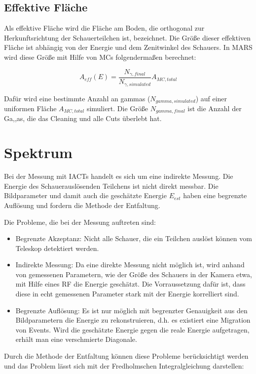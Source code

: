\subsection{Effektive Fläche}
Als effektive Fläche wird die Fläche am Boden, die orthogonal zur Herkunftsrichtung der Schauerteilchen ist, bezeichnet.
Die Größe dieser effektiven Fläche ist abhängig von der Energie und dem Zenitwinkel des Schauers.
In MARS wird diese Größe mit Hilfe von MCs folgendermaßen berechnet:

\begin{equation}
 A_{eff}(E)=\frac{N_{\gamma, final}}{N_{\gamma, simulated}}A_{MC, total}
\end{equation}

Dafür wird eine bestimmte Anzahl an gammas ($N_{gamma, simulated}$) auf einer uniformen Fläche $A_{MC,total}$ simuliert. 
Die Größe $N_{gamma, final}$ ist die Anzahl der Ga,,as, die das Cleaning und alle Cuts überlebt hat.


\section{Spektrum}
Bei der Messung mit IACTs handelt es sich um eine indirekte Messung.
Die Energie des Schauerauslösenden Teilchens ist nicht direkt messbar.
Die Bildparameter und damit auch die geschätzte Energie $E_{est}$ haben eine begrenzte Auflösung und fordern die Methode der Entfaltung.

Die Probleme, die bei der Messung auftreten sind:

\begin{itemize}
 \item Begrenzte Akzeptanz: Nicht alle Schauer, die ein Teilchen auslöst können vom Teleskop detektiert werden.
 \item Indirekte Messung: Da eine direkte Messung nicht möglich ist, wird anhand von gemessenen Parametern, wie der Größe des Schauers in der Kamera etwa, mit Hilfe eines RF die Energie geschätzt.
       Die Vorraussetzung dafür ist, dass diese in echt gemessenen Parameter stark mit der Energie korrelliert sind.
 \item Begrenzte Auflösung: Es ist nur möglich mit begrenzter Genauigkeit aus den Bildparametern die Energie zu rekonstruieren, d.h. es existiert eine Migration von Events.
       Wird die geschätzte Energie gegen die reale Energie aufgetragen, erhält man eine verschmierte Diagonale.
\end{itemize}

Durch die Methode der Entfaltung können diese Probleme berücksichtigt werden und das Problem lässt sich mit der Fredholmschen Integralgleichung darstellen:

